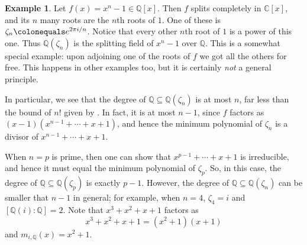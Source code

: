 \documentclass[12pt]{report}
\numberwithin{equation}{section}
\numberwithin{theorem}{chapter}
\theoremstyle{definition}
\newtheorem{definition}[theorem]{Definition}
\newtheorem{example}[theorem]{Example}
\newtheorem*{basic properties}{Basic Properties}
\newtheorem*{Important Remark}{Important Remark}
\newcommand{\df}[1]{{\bf #1}\index{#1}}
\newcommand{\N}{\mathbb{N}}
\newcommand{\Q}{\mathbb{Q}}
\newcommand{\C}{\mathbb{C}}
\begin{document}
\begin{example} 
Let $f(x) = x^n -1 \in \Q[x]$. Then $f$ splits completely in
  $\C[x]$, and its $n$ many roots are the $n$th roots of $1$. One of these
  is $\zeta_n \colonequals e^{2 \pi i/n}$. Notice that every other $n$th root of $1$ is a power of this one. 
Thus $\Q(\zeta_n)$ is the splitting field of $x^n-1$ over $\Q$. 
This is a somewhat special example: upon adjoining one of the roots of $f$ we got all the others for free. This happens in other examples too, but it is certainly {\em not} a general principle.


In particular, we see that the degree of $\Q \subseteq \Q(\zeta_n)$ is at most $n$, far less than the bound of $n!$ given by .
In fact, it is at most $n-1$, since $f$ factors as $(x-1)(x^{n-1} + \cdots + x + 1)$, and hence the minimum polynomial of $\zeta_n$ is a divisor of $x^{n-1} + \cdots + x + 1$. 

When $n = p$ is prime, then one can show that $x^{p-1} + \cdots + x + 1$ is irreducible, and hence it must equal the minimum polynomial of $\zeta_p$. So, in this case, the degree of $\Q \subseteq \Q(\zeta_p)$ is exactly $p-1$.
However, the degree of $\Q \subseteq \Q(\zeta_n)$ can be smaller that $n-1$ in general; for example, when $n = 4$, $\zeta_4  = i$ and $[\Q(i): \Q] = 2$. Note that $x^3 + x^2 + x + 1$ factors as 
$$x^3 + x^2 + x + 1 = (x^2+1)(x+1)$$
and $m_{i, \Q}(x) = x^2 + 1$.
\end{example}




\end{document}
